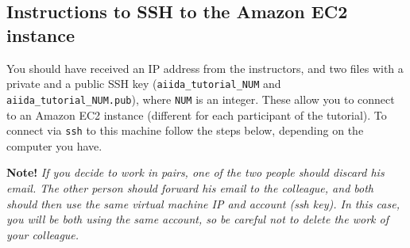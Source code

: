 \subsection{Instructions to SSH to the Amazon EC2 instance}
\label{sec:sshintro}
You should have received an IP address from the instructors, and two files with a private and a public
SSH key (\verb|aiida_tutorial_NUM| and
\verb|aiida_tutorial_NUM.pub|), where \verb|NUM| is an
integer.
These allow you to connect to an Amazon EC2 instance (different for
each participant of the tutorial). To connect via \texttt{ssh} to this machine follow the steps below, depending on the computer you have.

\textbf{Note!} \emph{If you decide to work in pairs, one of the two people should discard his email. The other person should forward his email to the colleague, and both should then use the same virtual machine IP and account (ssh key). In this case, you will be both using the same account, so be careful not to delete the work of your colleague.}

